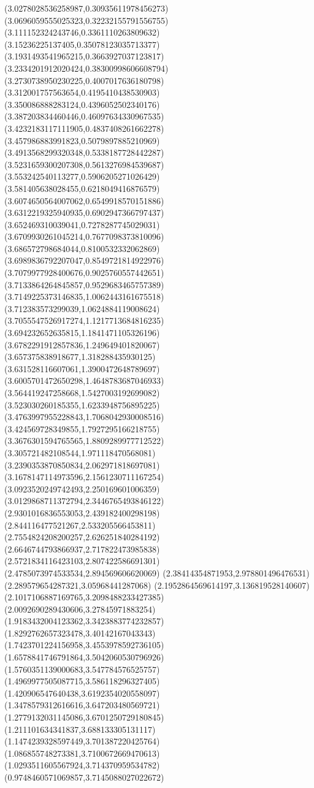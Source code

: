 {(3.0278028536258987,0.30935611978456273)
(3.0696059555025323,0.32232155791556755)
(3.111152324243746,0.3361110263809632)
(3.15236225137405,0.35078123035713377)
(3.1931493541965215,0.3663927037123817)
(3.2334201912020424,0.38300998606608794)
(3.2730738950230225,0.4007017636180798)
(3.312001757563654,0.4195410438530903)
(3.350086888283124,0.4396052502340176)
(3.387203834460446,0.46097634330967535)
(3.4232183117111905,0.4837408261662278)
(3.457986883991823,0.5079897885210969)
(3.4913568299320348,0.5338187728442287)
(3.5231659300207308,0.5613276984539687)
(3.553242540113277,0.5906205271026429)
(3.581405638028455,0.6218049416876579)
(3.6074650564007062,0.6549918570151886)
(3.6312219325940935,0.6902947366797437)
(3.652469310039041,0.7278287745029031)
(3.6709930261045214,0.7677098373810096)
(3.686572798684044,0.8100532332062869)
(3.6989836792207047,0.8549721814922976)
(3.7079977928400676,0.9025760557442651)
(3.7133864264845857,0.9529683465757389)
(3.7149225373146835,1.0062443161675518)
(3.712383573299039,1.0624884119008624)
(3.7055547526917274,1.1217713684816235)
(3.694232652635815,1.1841471105326196)
(3.6782291912857836,1.249649401820067)
(3.657375838918677,1.318288435930125)
(3.631528116607061,1.3900472648789697)
(3.6005701472650298,1.4648783687046933)
(3.564419247258668,1.5427003192699082)
(3.523030260185355,1.6233948756895225)
(3.4763997955228843,1.7068042930008516)
(3.424569728349855,1.7927295166218755)
(3.3676301594765565,1.8809289977712522)
(3.305721482108544,1.971118470568081)
(3.2390353870850834,2.062971818697081)
(3.1678147114973596,2.1561230711167254)
(3.0923520249742493,2.250169601006359)
(3.0129868711372794,2.3446765493846122)
(2.9301016836553053,2.439182400298198)
(2.844116477521267,2.533205566453811)
(2.7554824208200257,2.626251840284192)
(2.6646744793866937,2.717822473985838)
(2.5721834116423103,2.807422586691301)
(2.4785073974533534,2.894569606620069)
(2.38414354871953,2.978801496476531)
(2.289579654287321,3.05968441287068)
(2.1952864569614197,3.136819528140607)
(2.1017106887169765,3.2098488233427385)
(2.0092690289430606,3.27845971883254)
(1.9183432004123362,3.3423883774232857)
(1.8292762657323478,3.40142167043343)
(1.7423701224156958,3.4553978592736105)
(1.6578841746791864,3.5042060530796926)
(1.5760351139000683,3.547784576525757)
(1.4969977505087715,3.586118296327405)
(1.420906547640438,3.6192354020558097)
(1.3478579312616616,3.647203480569721)
(1.2779132031145086,3.6701250729180845)
(1.211101634341837,3.688133305131117)
(1.1474239328597449,3.701387220425764)
(1.086855748273381,3.7100672669470613)
(1.0293511605567924,3.714370959534782)
(0.9748460571069857,3.7145088027022672)
}

